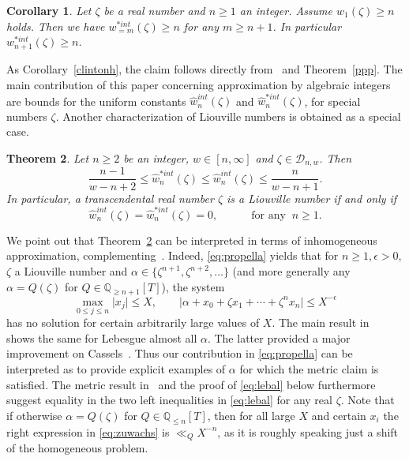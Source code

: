 \documentclass[12pt]{amsart}
\newtheorem{theorem}{Theorem}[section]
\newtheorem{corollary}[theorem]{Corollary}
\theoremstyle{definition}
\begin{document}
\begin{corollary} \label{clintonhi}
Let $\zeta$ be a real number and $n\geq 1$ an integer. Assume $w_{1}(\zeta)\geq n$ holds. Then
we have $w_{=m}^{\ast int}(\zeta)\geq n$ for any $m\geq n+1$. In particular $w_{n+1}^{\ast int}(\zeta)\geq n$.
\end{corollary}

As Corollary~\ref{clintonh}, the claim follows directly 
from~\cite[Theorem~1.12]{j3} and Theorem~\ref{ppp}.
The main contribution of this paper concerning approximation by algebraic integers
are bounds for the uniform constants $\widehat{w}_{n}^{int}(\zeta)$
and $\widehat{w}_{n}^{\ast int}(\zeta)$, for 
special numbers $\zeta$.
Another characterization of Liouville numbers is obtained as a special case.

\begin{theorem} \label{algint}
Let $n\geq 2$ be an integer, $w\in[n,\infty]$ and 
$\zeta\in\mathscr{D}_{n,w}$. Then
%
\begin{equation} \label{eq:lebal}
\frac{n-1}{w-n+2} \leq 
\widehat{w}_{n}^{\ast int}(\zeta) \leq
\widehat{w}_{n}^{int}(\zeta) \leq \frac{n}{w-n+1}.
\end{equation}
%
In particular, a transcendental real number $\zeta$ is a Liouville number if and only if
%
\begin{equation} \label{eq:propella}
\widehat{w}_{n}^{int}(\zeta)=\widehat{w}_{n}^{\ast int}(\zeta)= 0, \qquad\quad \text{for any} \;\; n\geq 1.
\end{equation}
%
\end{theorem}

We point out that Theorem~\ref{algint} can be interpreted 
in terms of inhomogeneous approximation,
complementing~\cite{bula}.
Indeed, \eqref{eq:propella} yields that 
for $n\geq 1 ,\epsilon>0$, $\zeta$ a Liouville number and $\alpha\in\{\zeta^{n+1},\zeta^{n+2},\ldots\}$ (and more generally
any $\alpha=Q(\zeta)$ for $Q\in\mathbb{Q}_{\geq n+1}[T]$), 
the system
%
\begin{equation} \label{eq:zuwachs}
\max_{0\leq j\leq n} \vert x_{j}\vert \leq X, \qquad  \vert \alpha+x_{0}+\zeta x_{1}+\cdots+\zeta^{n}x_{n}\vert \leq X^{-\epsilon}
\end{equation}
%
has no solution for certain arbitrarily large values of $X$. 
The main result in~\cite{bula} shows the same for Lebesgue almost
all $\alpha$. The latter provided a major
improvement on Cassels~\cite[Theorem~3 of Chapter III]{cassels}. Thus our contribution in \eqref{eq:propella}
can be interpreted as to provide explicit examples of $\alpha$ for which the metric claim is satisfied. 
The metric result in~\cite{bula} and the proof of \eqref{eq:lebal} below furthermore suggest equality in the two left inequalities in \eqref{eq:lebal} for any real $\zeta$.
Note that if otherwise $\alpha=Q(\zeta)$ 
for $Q\in\mathbb{Q}_{\leq n}[T]$, then for 
all large $X$ and certain $x_{i}$ the right expression in \eqref{eq:zuwachs} is $\ll_{Q}X^{-n}$, as it is 
roughly speaking just a shift of the homogeneous problem.
\end{document}

